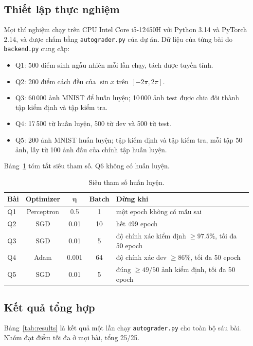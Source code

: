 \documentclass[conference]{IEEEtran}
\begin{document}
\subsection{Thiết lập thực nghiệm}
Mọi thí nghiệm chạy trên CPU Intel Core i5-12450H với Python 3.14 và
PyTorch 2.14, và được chấm bằng \texttt{autograder.py} của dự án. Dữ liệu
của từng bài do \texttt{backend.py} cung cấp:
\begin{itemize}
  \item Q1: 500 điểm sinh ngẫu nhiên mỗi lần chạy, tách được tuyến tính.
  \item Q2: 200 điểm cách đều của $\sin x$ trên $[-2\pi, 2\pi]$.
  \item Q3: 60\,000 ảnh MNIST để huấn luyện; 10\,000 ảnh test được chia đôi
  thành tập kiểm định và tập kiểm tra.
  \item Q4: 17\,500 từ huấn luyện, 500 từ dev và 500 từ test.
  \item Q5: 200 ảnh MNIST huấn luyện; tập kiểm định và tập kiểm tra, mỗi tập
  50 ảnh, lấy từ 100 ảnh đầu của chính tập huấn luyện.
\end{itemize}
Bảng~\ref{tab:hparams} tóm tắt siêu tham số. Q6 không có huấn luyện.

\begin{table}[!t]
    \centering
    \renewcommand{\arraystretch}{1.15}
    \footnotesize
    \caption{Siêu tham số huấn luyện.}
    \label{tab:hparams}
    \begin{tabularx}{\columnwidth}{@{}lcccX@{}}
    \toprule
        \textbf{Bài} & \textbf{Optimizer} & $\boldsymbol{\eta}$ & \textbf{Batch}
        & \textbf{Dừng khi} \\
    \midrule
        Q1 & Perceptron & 0.5 & 1 & một epoch không có mẫu sai \\
        Q2 & SGD & 0.01 & 10 & hết 499 epoch \\
        Q3 & SGD & 0.01 & 5 & độ chính xác kiểm định $\ge 97.5\%$, tối đa 50 epoch \\
        Q4 & Adam & 0.001 & 64 & độ chính xác dev $\ge 86\%$, tối đa 50 epoch \\
        Q5 & SGD & 0.01 & 5 & đúng $\ge 49/50$ ảnh kiểm định, tối đa 50 epoch \\
    \bottomrule
    \end{tabularx}
\end{table}

\subsection{Kết quả tổng hợp}
Bảng~\ref{tab:results} là kết quả một lần chạy \texttt{autograder.py} cho
toàn bộ sáu bài. Nhóm đạt điểm tối đa ở mọi bài, tổng 25/25.
\end{document}
